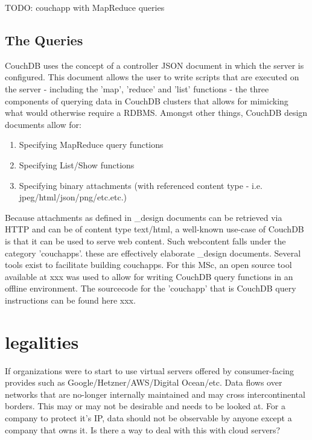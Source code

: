 TODO: couchapp with MapReduce queries

\subsection{The Queries}

CouchDB uses the concept of a controller JSON document in which the server is configured. This document allows the user to write scripts that are executed on the server - including the 'map', 'reduce' and 'list' functions - the three components of querying data in CouchDB clusters that allows for mimicking what would otherwise require a RDBMS. Amongst other things, CouchDB design documents allow for:

\begin{enumerate}
    \item Specifying MapReduce query functions
    \item Specifying List/Show functions
    \item Specifying binary attachments (with referenced content type - i.e. jpeg/html/json/png/etc.etc.)
\end{enumerate}

Because attachments as defined in \_design documents can be retrieved via HTTP and can be of content type text/html, a well-known use-case of CouchDB is that it can be used to serve web content. Such webcontent falls under the category 'couchapps'. these are effectively elaborate \_design documents. Several tools exist to facilitate building couchapps. For this MSc, an open source tool available at xxx was used to allow for writing CouchDB query functions in an offline environment. The sourcecode for the 'couchapp' that is CouchDB query instructions can be found here xxx.

\section{legalities}
If organizations were to start to use virtual servers offered by consumer-facing provides such as Google/Hetzner/AWS/Digital Ocean/etc. Data flows over networks that are no-longer internally maintained and may cross intercontinental borders. This may or may not be desirable and needs to be looked at. For a company to protect it's IP, data should not be observable by anyone except a company that owns it. Is there a way to deal with this with cloud servers?